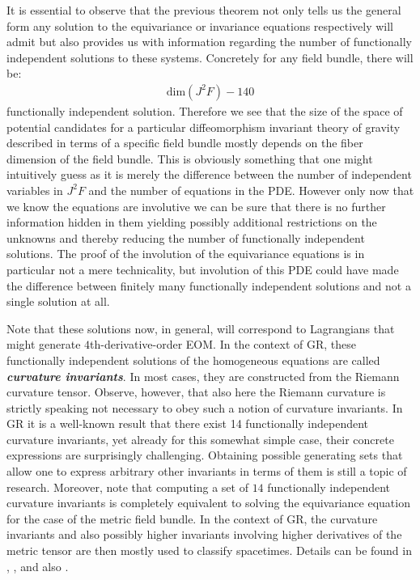 It is essential to observe that the previous theorem not only tells us the general form any solution to the equivariance or invariance equations respectively will admit but also provides us with information regarding the number of functionally independent solutions to these systems. Concretely for any field bundle, there will be: 
\begin{align}
    \mathrm{dim}(J^2F) - 140 
\end{align}
functionally independent solution.
Therefore we see that the size of the space of potential candidates for a particular diffeomorphism invariant theory of gravity described in terms of a specific field bundle mostly depends on the fiber dimension of the field bundle. 
This is obviously something that one might intuitively guess as it is merely the difference between the number of independent variables in $J^2F$ and the number of equations in the PDE. However only now that we know the equations are involutive we can be sure that there is no further information hidden in them yielding possibly additional restrictions on the unknowns and thereby reducing the number of functionally independent solutions. 
The proof of the involution of the equivariance equations is in particular not a mere technicality, but involution of this PDE could have made the difference between finitely many functionally independent solutions and not a single solution at all. 

Note that these solutions now, in general, will correspond to Lagrangians that might generate $4$th-derivative-order EOM. 
In the context of GR, these functionally independent solutions of the homogeneous equations are called \textit{\textbf{curvature invariants}}. In most cases, they are constructed from the Riemann curvature tensor. Observe, however, that also here the Riemann curvature is strictly speaking not necessary to obey such a notion of curvature invariants. 
In GR it is a well-known result that there exist 14 functionally independent curvature invariants, yet already for this somewhat simple case, their concrete expressions are surprisingly challenging. Obtaining possible generating sets that allow one to express arbitrary other invariants in terms of them is still a topic of research. 
Moreover, note that computing a set of $14$ functionally independent curvature invariants is completely equivalent to solving the equivariance equation for the case of the metric field bundle.
In the context of GR, the curvature invariants and also possibly higher invariants involving higher derivatives of the metric tensor are then mostly used to classify spacetimes. Details can be found in
\cite{2009CQGra..26b5013C}, \cite{Zakhary1997}, \cite{2002IJMPD..11..827C} and also \cite{doi:10.1063/1.531425}.


